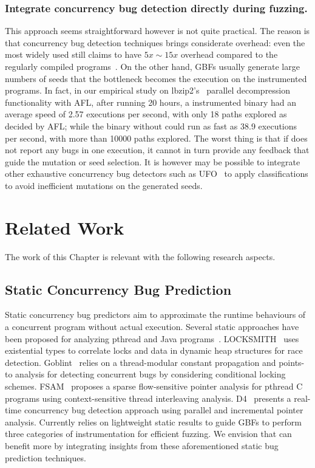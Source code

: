 \subsubsection{Integrate concurrency bug detection directly during fuzzing.}\label{sec:discuss_ts_cbugs}
This approach seems straightforward however is not quite practical. The reason is that concurrency bug detection techniques brings considerate overhead: even the most widely used \ts still claims to have $5x\sim 15x$ overhead compared to the regularly compiled programs~\cite{kcc:tsan,lwn_tsan}. On the other hand, GBFs usually generate large numbers of seeds that the bottleneck becomes the execution on the \ts instrumented programs. In fact, in our empirical study on lbzip2's~\cite{lbzip2} parallel decompression functionality with AFL, after running 20 hours, a \ts instrumented binary had an average speed of 2.57 executions per second, with only 18 paths explored as decided by AFL; while the binary without \ts could run as fast as 38.9 executions per second, with more than 10000 paths explored. The worst thing is that if \ts does not report any bugs in one execution, it cannot in turn provide any feedback that guide the mutation or seed selection. It is however may be possible to integrate other exhaustive concurrency bug detectors such as UFO~\cite{icse18_ufo} to apply classifications to avoid inefficient mutations on the generated seeds.


\section{Related Work}

The work of this Chapter is relevant with the following research aspects.

\subsection{Static Concurrency Bug Prediction}
Static concurrency bug predictors aim to approximate the runtime behaviours of a concurrent program without actual execution. Several static approaches have been proposed for analyzing pthread and Java  programs~\cite{pratikakis2006locksmith,Vojdani2009,DBLP:conf/cgo/SuiDX16,Liupldi2018,racerdoopsla2018}. LOCKSMITH~\cite{pratikakis2006locksmith} uses existential types to correlate locks and data in dynamic heap structures for race detection. Goblint~\cite{Vojdani2009} relies on a thread-modular constant propagation and points-to analysis for detecting concurrent bugs by considering conditional locking schemes. FSAM~\cite{DBLP:conf/cgo/SuiDX16} proposes a sparse flow-sensitive pointer analysis for pthread C programs  using context-sensitive thread interleaving analysis. 
D4~\cite{Liupldi2018} presents a real-time concurrency bug detection approach using parallel and incremental pointer analysis. 
Currently \mtfuzz relies on lightweight static results to guide GBFs to perform three categories of instrumentation for efficient fuzzing. We envision that \mtfuzz can benefit more by integrating insights from these aforementioned static bug prediction techniques.

